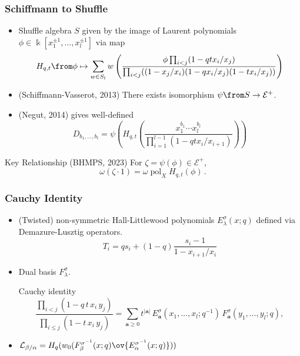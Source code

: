 \documentclass[dvipsnames]{beamer}
\DeclareMathOperator{\pol}{pol}
\newcommand{\Ecal}{\mathcal{E}}
\newcommand{\kk}{\Bbbk}
\newcommand{\aA}{{\mathbf a}}
\theoremstyle{definition}
\newcounter{c}
\begin{document}
\begin{frame}
  \frametitle{Schiffmann to Shuffle}
  \begin{itemize}
  \item Shuffle algebra \(S\) given by the image of Laurent
    polynomials \(\phi \in \kk[x_1^{\pm 1},\ldots, x_l^{\pm 1}]\) via
    map \[
      H_{q,t}\from \phi \mapsto \sum_{w \in S_l} w \left( \frac{\phi \prod_{i<j}
          (1-qt x_i/x_j)}{\prod_{i<j}((1-x_j/x_i)(1-q x_i/x_j)(1-t x_i/x_j))} \right)
    \]
  \item (Schiffmann-Vasserot, 2013) There exists isomorphism \(\psi \from S \to \Ecal^+\).
  \item (Negut, 2014) gives well-defined \[
    D_{b_1,\ldots,b_l} = \psi \left(H_{q,t}\left(\frac{x_1^{b_1}\cdots
        x_l^{b_l}}{\prod_{i=1}^{l-1} (1-qt x_i/x_{i+1})}  \right)\right)
  \]
  \end{itemize}
  \begin{block}{Key Relationship (BHMPS, 2023)}
    For \(\zeta = \psi(\phi) \in \Ecal^+\), 
    \[
      \omega(\zeta \cdot 1) = \omega \pol_X H_{q,t}(\phi) \,.
    \]
  \end{block}
\end{frame}
\begin{frame}
  \frametitle{Cauchy Identity}
  \begin{itemize}
  \item (Twisted) non-symmetric Hall-Littlewood polynomials
    \(E_\lambda^\sigma(x;q)\) defined via Demazure-Lusztig
    operators. \[
      T_i = qs_i+(1-q)\frac{s_i-1}{1-x_{i+1}/x_i}
    \]
  \item Dual basis \(F_\lambda^\sigma\).
    \begin{block}{Cauchy identity}
      \[ \frac{\prod _{i<j} (1 - q\, t\, x_{i} \, y_{j})}{\prod
          _{i\leq j} (1 - t\, x_{i}\, y_{j})} = \sum _{\aA \geq 0}
        t^{|\aA |}\, E^{\sigma }_{\aA }(x_{1},\ldots,x_{l};q^{-1}) \,
        F^{\sigma }_{\aA }(y_{1},\ldots,y_{l};q),
      \]
    \end{block}
  \item \(\mathcal{L}_{\beta/\alpha} = H_q(
    w_0(F_\beta^{\sigma^{-1}}(x;q)
      \ov{E_\alpha^{\sigma^{-1}}(x;q)})) \)
  \end{itemize}
\end{frame}
\end{document}
